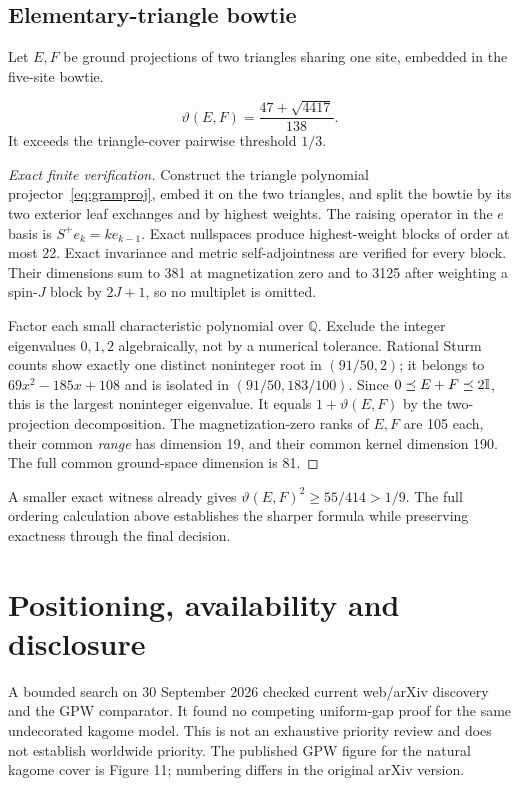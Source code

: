 \documentclass[11pt,a4paper]{article}
\theoremstyle{remark}\newtheorem{remark}[theorem]{Remark}
\begin{document}
\subsection{Elementary-triangle bowtie}
Let $E,F$ be ground projections of two triangles sharing one site, embedded in the five-site bowtie.
\begin{proposition}\label{prop:bowtie}
\[
 \vartheta(E,F)=\frac{47+\sqrt{4417}}{138}.
\]
It exceeds the triangle-cover pairwise threshold $1/3$.
\end{proposition}
\begin{proof}[Exact finite verification]
Construct the triangle polynomial projector~\eqref{eq:gramproj}, embed it on the two triangles, and split the bowtie by its two exterior leaf exchanges and by highest weights. The raising operator in the $e$ basis is $S^+e_k=k e_{k-1}$. Exact nullspaces produce highest-weight blocks of order at most 22. Exact invariance and metric self-adjointness are verified for every block. Their dimensions sum to 381 at magnetization zero and to 3125 after weighting a spin-$J$ block by $2J+1$, so no multiplet is omitted.

Factor each small characteristic polynomial over $\mathbb Q$. Exclude the integer eigenvalues $0,1,2$ algebraically, not by a numerical tolerance. Rational Sturm counts show exactly one distinct noninteger root in $(91/50,2)$; it belongs to $69x^2-185x+108$ and is isolated in $(91/50,183/100)$. Since $0\preceq E+F\preceq2\mathbb I$, this is the largest noninteger eigenvalue. It equals $1+\vartheta(E,F)$ by the two-projection decomposition. The magnetization-zero ranks of $E,F$ are 105 each, their common \emph{range} has dimension 19, and their common kernel dimension 190. The full common ground-space dimension is 81.
\end{proof}
A smaller exact witness already gives $\vartheta(E,F)^2\ge55/414>1/9$. The full ordering calculation above establishes the sharper formula while preserving exactness through the final decision.

\section{Positioning, availability and disclosure}
A bounded search on 30 September 2026 checked current web/arXiv discovery and the GPW comparator. It found no competing uniform-gap proof for the same undecorated kagome model. This is not an exhaustive priority review and does not establish worldwide priority. The published GPW figure for the natural kagome cover is Figure 11; numbering differs in the original arXiv version.
\end{document}
